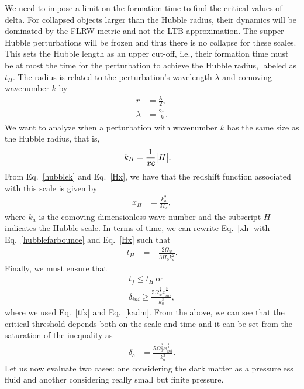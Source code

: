 \documentclass[a4paper,11pt]{article}
\begin{document}
We need to impose a limit on the formation time to find the critical values of delta. For collapsed objects larger than the Hubble radius, their dynamics will be dominated by the FLRW metric and not the LTB approximation. The supper-Hubble perturbations will be frozen and thus there is no collapse for these scales. This sets the Hubble length as an upper cut-off, i.e., their formation time must be at most the time for the perturbation to achieve the Hubble radius, labeled as $t_H$.  The radius is related to the perturbation's wavelength $\lambda$ and comoving wavenumber $k$ by~\cite{Quintin2016}
\begin{align}
	\label{radius}
	r       & =\frac{\lambda}{2}, \\
	\label{wavelength}
	\lambda & = \frac{2 \pi}{k}.
\end{align}
We want to analyze when a perturbation with wavenumber $k$ has the same size as the Hubble radius, that is,
\begin{align}
	\label{hubblek}
	k_H & = \frac{1}{xc}\abs{\Bar{H}}
	.\end{align}
From Eq.~\eqref{hubblek} and Eq.~\eqref{Hx}, we have that the redshift function associated with this scale is given by
\begin{align}
	\label{xh}
	x_H & = \frac{k_a^2 }{\Omega_w}
	,\end{align}
where $k_a$ is the comoving dimensionless wave number and the subscript $H$ indicates the Hubble scale. In terms of time, we can rewrite Eq.~\eqref{xh} with Eq.~\eqref{hubblefarbounce} and Eq.~\eqref{Hx} such that
\begin{align}
	t_H & = -\frac{2\Omega_w}{3 \bar{H}_0 k_a^2}
	.\end{align}
Finally, we must ensure that
\begin{align}
	\label{deltacf}
	t_f \leq t_H ~\text{or}\nonumber \\
	\delta_{ini} \geq \frac{5\Omega_w^{\frac{3}{2}} x_{ini}^{\frac{3}{2}}}{k_a^3}
	,\end{align}
where we used Eq.~\eqref{tfx} and Eq.~\eqref{kadm}. From the above, we can see that the critical threshold depends both on the scale and time and it can be set from the saturation of the inequality as
\begin{align}
	\label{deltacfinal}
	\delta_c & =
	\frac{5 \Omega_w^{\frac{3}{2}} x_{ini}^{\frac{3}{2}}}{k_a^3}
	.\end{align}
Let us now evaluate two cases: one considering the dark matter as a pressureless fluid and another considering really small but finite pressure.
\end{document}
